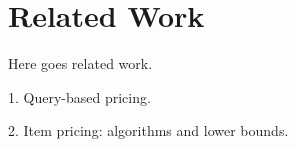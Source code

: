 \section{Related Work}
\label{sec:related}

Here goes related work.

1. Query-based pricing.

2. Item pricing: algorithms and lower bounds.


